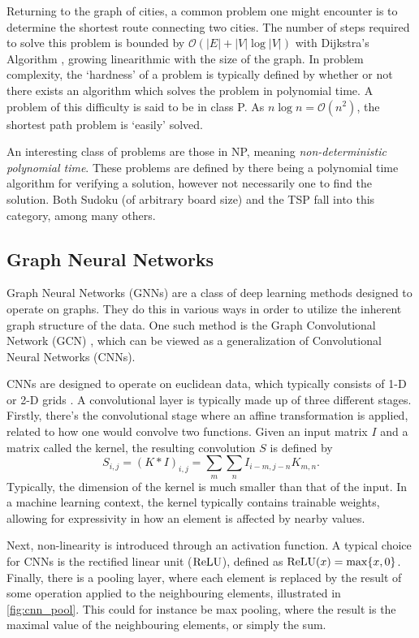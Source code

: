 Returning to the graph of cities, a common problem one might encounter is to determine the shortest route connecting two cities.
The number of steps required to solve this problem is bounded by $\mathcal{O}(|E| + |V| \log|V|)$ with Dijkstra's Algorithm \cite{dijkstra}, growing linearithmic with the size of the graph.
In problem complexity, the `hardness' of a problem is typically defined by whether or not there exists an algorithm which solves the problem in polynomial time.
A problem of this difficulty is said to be in class P.
As $n \log n = \mathcal{O}(n^2)$, the shortest path problem is `easily' solved.

An interesting class of problems are those in NP, meaning \textit{non-deterministic polynomial time}.
These problems are defined by there being a polynomial time algorithm for verifying a solution, however not necessarily one to find the solution.
Both Sudoku (of arbitrary board size) and the TSP fall into this category, among many others.

\subsection{Graph Neural Networks}
Graph Neural Networks (GNNs) are a class of deep learning methods designed to operate on graphs.
They do this in various ways in order to utilize the inherent graph structure of the data.
One such method is the Graph Convolutional Network (GCN) \cite{kipf2017semisupervised}, which can be viewed as a generalization of Convolutional Neural Networks (CNNs).

CNNs are designed to operate on euclidean data, which typically consists of 1-D or 2-D grids \cite[p.~326--339]{Goodfellow-et-al-2016}.
A convolutional layer is typically made up of three different stages.
Firstly, there's the convolutional stage where an affine transformation is applied, related to how one would convolve two functions.
Given an input matrix $I$ and a matrix called the kernel, the resulting convolution $S$ is defined by
\begin{equation}
    S_{i,j} = (K * I)_{i,j} = \sum_m \sum_n I_{i - m, j - n} K_{m, n}.
\end{equation}
Typically, the dimension of the kernel is much smaller than that of the input.
In a machine learning context, the kernel typically contains trainable weights, allowing for expressivity in how an element is affected by nearby values.

Next, non-linearity is introduced through an activation function.
A typical choice for CNNs is the rectified linear unit ($\operatorname{ReLU}$), defined as $\operatorname{ReLU}(x) = \max\{x, 0\}$.
Finally, there is a pooling layer, where each element is replaced by the result of some operation applied to the neighbouring elements, illustrated in \autoref{fig:cnn_pool}.
This could for instance be max pooling, where the result is the maximal value of the neighbouring elements, or simply the sum.

